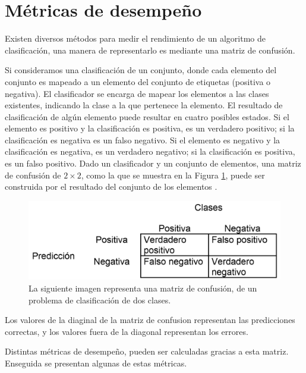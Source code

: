 

\section{Métricas de desempeño}\label{Metricas}

Existen diversos métodos para medir el rendimiento de un algoritmo de clasificación, una manera de representarlo es mediante una matriz de confusión. 

Si consideramos una clasificación de un conjunto, donde cada elemento del conjunto es mapeado a un elemento del conjunto de etiquetas (positiva o negativa). El clasificador se encarga de mapear los elementos a las clases existentes, indicando la clase a la que pertenece la elemento.
El resultado de clasificación de algún elemento puede resultar en cuatro posibles estados. Si el elemento es positivo y la clasificación es positiva, es un verdadero positivo; si la clasificación es negativa es un falso negativo. Si el elemento es negativo y la clasificación es negativa, es un verdadero negativo; si la clasificación es positiva, es un falso positivo.  
Dado un clasificador y un conjunto de elementos, una matriz de confusión de $2 \times 2$, como la que se muestra en la Figura \ref{fig:Matrix}, puede ser construida por el resultado del conjunto de los elementos \citep{Fawcett2006}.   
\begin{figure}[h!]
\begin{center}
\includegraphics[scale=.4]{./Figures/MatrixConfusion.png}
\end{center}
\caption{La siguiente imagen representa una matriz de confusión, de un problema de clasificación de dos clases.}
\label{fig:Matrix}
\end{figure}
Los valores de la diaginal de la matriz de confusion representan las predicciones correctas, y los valores fuera de la diagonal representan los errores.

Distintas métricas de desempeño, pueden ser calculadas gracias a esta matriz. Enseguida se presentan algunas de estas métricas.

